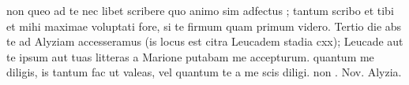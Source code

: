 


 non queo ad te nec libet scribere quo animo sim adfectus ; tantum scribo et tibi et mihi maximae voluptati fore, si te firmum quam primum videro. Tertio die abs te ad Alyziam accesseramus (is locus est citra Leucadem stadia cxx); Leucade aut te ipsum aut tuas litteras a Marione putabam me accepturum. quantum me diligis, is tantum fac ut valeas, vel quantum te a me scis diligi. non . Nov. Alyzia.
